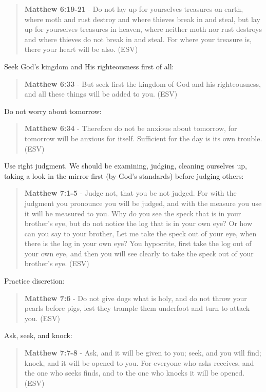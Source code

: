\documentclass[11pt]{article}
\begin{document}
\begin{quote}
\textbf{Matthew 6:19-21} - Do not lay up for yourselves treasures on earth, where moth and rust destroy and where thieves break in and steal, but lay up for yourselves treasures in heaven, where neither moth nor rust destroys and where thieves do not break in and steal. For where your treasure is, there your heart will be also. (ESV)
\end{quote}

Seek God's kingdom and His righteousness first of all:

\begin{quote}
\textbf{Matthew 6:33} - But seek first the kingdom of God and his righteousness, and all these things will be added to you. (ESV)
\end{quote}

Do not worry about tomorrow:

\begin{quote}
\textbf{Matthew 6:34} - Therefore do not be anxious about tomorrow, for tomorrow will be anxious for itself. Sufficient for the day is its own trouble. (ESV)
\end{quote}

Use right judgment. We should be examining, judging, cleaning ourselves up, taking a look in the mirror first (by God's standards) before judging others:

\begin{quote}
\textbf{Matthew 7:1-5} - Judge not, that you be not judged. For with the judgment you pronounce you will be judged, and with the measure you use it will be measured to you. Why do you see the speck that is in your brother's eye, but do not notice the log that is in your own eye? Or how can you say to your brother, Let me take the speck out of your eye, when there is the log in your own eye? You hypocrite, first take the log out of your own eye, and then you will see clearly to take the speck out of your brother's eye. (ESV)
\end{quote}

Practice discretion:

\begin{quote}
\textbf{Matthew 7:6} - Do not give dogs what is holy, and do not throw your pearls before pigs, lest they trample them underfoot and turn to attack you. (ESV)
\end{quote}

Ask, seek, and knock:

\begin{quote}
\textbf{Matthew 7:7-8} - Ask, and it will be given to you; seek, and you will find; knock, and it will be opened to you. For everyone who asks receives, and the one who seeks finds, and to the one who knocks it will be opened. (ESV)
\end{quote}
\end{document}
